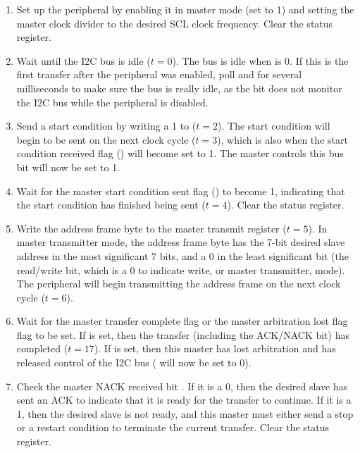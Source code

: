 \begin{enumerate}
	\item Set up the  peripheral by enabling it in master mode (set  to 1) and setting the master clock divider  to the desired SCL clock frequency. Clear the status register.
	\item Wait until the I2C bus is idle ($t = 0$). The bus is idle when  is 0. If this is the first transfer after the  peripheral was enabled, poll  and  for several milliseconds to make sure the bus is really idle, as the  bit does not monitor the I2C bus while the peripheral is disabled.
	\item \label{proc:i2c-master-transmitter-send-start} Send a start condition by writing a 1 to  ($t = 2$). The start condition will begin to be sent on the next clock cycle ($t = 3$), which is also when the start condition received flag () will become set to 1. The master controls this bus bit  will now be set to 1.
	\item Wait for the master start condition sent flag () to become 1, indicating that the start condition has finished being sent ($t = 4$). Clear the status register.
	\item Write the address frame byte to the master transmit register  ($t = 5$). In master transmitter mode, the address frame byte has the 7-bit desired slave address in the most significant 7 bits, and a 0 in the least significant bit (the read/write bit, which is a 0 to indicate write, or master transmitter, mode). The  peripheral will begin transmitting the address frame on the next clock cycle ($t = 6$).
	\item Wait for the master transfer complete flag  or the master arbitration lost flag  flag to be set. If  is set, then the transfer (including the ACK/NACK bit) has completed ($t = 17$). If  is set, then this master has lost arbitration and has released control of the I2C bus ( will now be set to 0).
	\item Check the master NACK received bit . If it is a 0, then the desired slave has sent an ACK to indicate that it is ready for the transfer to continue. If it is a 1, then the desired slave is not ready, and this master must either send a stop or a restart condition to terminate the current transfer. Clear the status register.

\end{enumerate}
